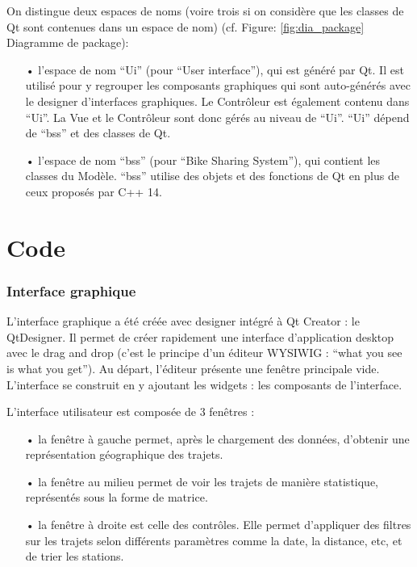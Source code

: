 \documentclass[12pt]{article}
\begin{document}
		On distingue deux espaces de noms (voire trois si on considère que les classes de
		Qt sont contenues dans un espace de nom) (cf. Figure: \ref{fig:dia_package} Diagramme de
		package):\\
	
		\begin{itemize}
		\item[•] l’espace de nom “Ui” (pour “User interface”), qui est généré par Qt.
		Il est utilisé pour y regrouper les composants graphiques qui sont auto-générés avec
		le designer d’interfaces graphiques. Le Contrôleur est également contenu dans “Ui”.
		La Vue et le Contrôleur sont donc gérés au niveau de “Ui”. “Ui” dépend de “bss” et des
		classes de Qt.\\
		
		\item[•]l’espace de nom “bss” (pour “Bike Sharing System”), qui contient les classes
		du Modèle. “bss” utilise des objets et des fonctions de Qt en plus de ceux proposés
		par C++ 14.
		\end{itemize}

\clearpage
\newpage
\part{Code}
	\section{Interface graphique}
	L’interface graphique a été créée avec designer intégré à Qt Creator : le QtDesigner. Il permet de créer rapidement une interface d’application desktop avec le drag and drop (c’est le principe d’un éditeur WYSIWIG : “what you see is what you get”). Au départ, l’éditeur présente une fenêtre principale vide. L’interface se construit en y ajoutant les widgets : les composants de l’interface.

	L’interface utilisateur est composée de 3 fenêtres :\\
	\begin{itemize}
	\item[•] la fenêtre à gauche permet, après le chargement des données, d’obtenir une représentation géographique des trajets.
	\item[•] la fenêtre au milieu permet de voir les trajets de manière statistique, représentés sous la forme de matrice.
	\item[•] la fenêtre à droite est celle des contrôles. Elle permet d’appliquer des filtres sur les trajets selon différents paramètres comme la date, la distance, etc, et de trier les stations.
	\end{itemize}
	
\end{document}
